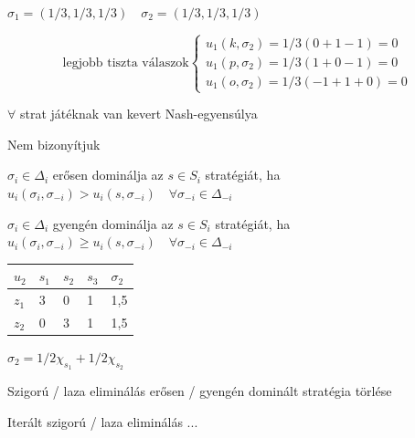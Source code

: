 	\begin{center}
		$\sigma_1 = (1/3, 1/3, 1/3) \quad \sigma_2 = (1/3, 1/3, 1/3)$
	\end{center}
	
	\[\text{legjobb tiszta válaszok}
	\begin{cases}
		u_1(k, \sigma_2) = 1/3(0+1-1)=0 \\
		u_1(p, \sigma_2) = 1/3(1+0-1)=0 \\
		u_1(o, \sigma_2) = 1/3(-1+1+0)=0
	\end{cases}
	\]
	
	\begin{theorem}{}{}
		$\forall$ strat játéknak van kevert Nash-egyensúlya
	\end{theorem}
	
	Nem bizonyítjuk
	
	\begin{definition}{}{}
		$\sigma_i \in \Delta_i$ erősen dominálja az $s \in S_i$ stratégiát, ha $u_i(\sigma_i, \sigma_{-i}) > u_i(s, \sigma_{-i}) \quad \forall \sigma_{-i} \in \Delta_{-i}$
	\end{definition}
	
	\begin{definition}{}{}
		$\sigma_i \in \Delta_i$ gyengén dominálja az $s \in S_i$ stratégiát, ha $u_i(\sigma_i, \sigma_{-i}) \geq u_i(s, \sigma_{-i}) \quad \forall \sigma_{-i} \in \Delta_{-i}$
	\end{definition}
	
	\begin{center}
		\begin{tabular}{|l|l|l|l|l|}
			\hline
			$u_2$ & $s_1$ & $s_2$ & $s_3$ & $\sigma_2$ \\ \hline
			$z_1$ & 3    & 0    & 1    & 1,5                      \\ \hline
			$z_2$ & 0    & 3    & 1    & 1,5                      \\ \hline
		\end{tabular}
	\end{center}
	
	\begin{center}
		$\sigma_2 = 1/2 \chi_{s_1} + 1/2 \chi_{s_2}$
	\end{center}
	
	\begin{definition}{Szigorú / laza eliminálás}{}
		erősen / gyengén dominált stratégia törlése
	\end{definition}
	
	\begin{definition}{}{}
		Iterált szigorú / laza eliminálás ...
	\end{definition}
	
